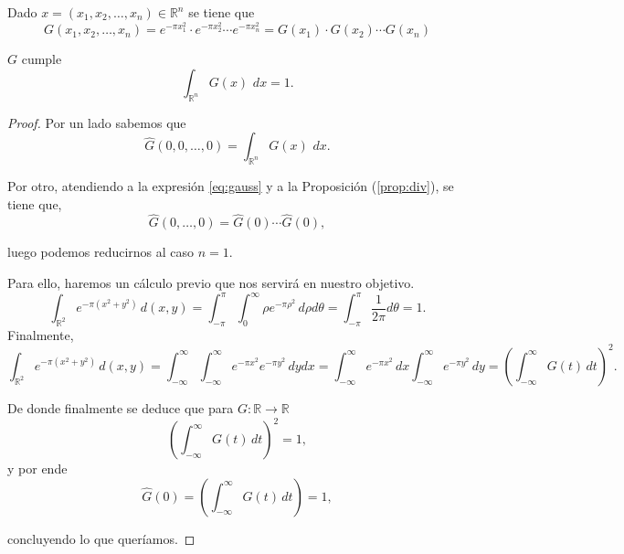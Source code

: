 \begin{observacion}\label{obs:desc}
    Dado $x = (x_1,x_2,\ldots, x_n) \in \mathbb{R}^n$ se tiene que 
    \begin{equation}\label{eq:gauss}
        G(x_1,x_2,\ldots, x_n) = e^{- \pi x_1^2} \cdot e^{- \pi x_2^2} \cdots e^{- \pi x_n^2} = G(x_1)\cdot G(x_2) \cdots G(x_n)
    \end{equation}
\end{observacion}



\begin{lema}\label{lem:leam}
$G$ cumple
\begin{equation}
    \int_{\mathbb{R}^n} G(x)\, \, dx = 1 .
\end{equation}
\end{lema}
\begin{proof}
Por un lado sabemos que
\begin{equation}
   \widehat{G}(0,0, \ldots, 0) = \int_{\mathbb{R}^n} G(x)\, \, dx   .
\end{equation}

\noindent Por otro, atendiendo a la expresión \eqref{eq:gauss} y a la Proposición (\ref{prop:div}), se tiene que, 
\begin{equation}
    \widehat{G}(0, \ldots, 0) = \widehat{G}(0) \cdots \widehat{G}(0),
\end{equation}

\noindent luego podemos reducirnos al caso $n=1$.

\noindent Para ello, haremos un cálculo previo que nos servirá en nuestro objetivo.
\begin{equation}
    \int_{\mathbb{R}^2}e^{- \pi (x^2+y^2)} \, d(x,y) = \int_{-\pi}^{\pi}\int_{0}^{\infty}\rho e^{- \pi \rho^2} \, d \rho d\theta = \int_{-\pi}^{\pi} \frac{1}{2 \pi}d\theta = 1.
\end{equation}
Finalmente, 
\begin{equation}
\int_{\mathbb{R}^2}e^{- \pi (x^2+y^2)} \, d(x,y) = \int_{-\infty}^{\infty}\int_{-\infty}^{\infty} e^{- \pi x^2}e^{- \pi y^2} \, dy dx = \int_{-\infty}^{\infty}e^{- \pi x^2}  \, dx\int_{-\infty}^{\infty} e^{- \pi y^2} \, dy = \left( \int_{-\infty}^{\infty} G(t) \, dt \right)^2.
\end{equation}

\noindent De donde finalmente se deduce que para $G: \mathbb{R}  \rightarrow \mathbb{R}$
\begin{equation}
    \left( \int_{-\infty}^{\infty} G(t) \, dt \right)^2  = 1,
\end{equation}
y por ende 
\begin{equation}
    \widehat{G}(0) = \left( \int_{-\infty}^{\infty} G(t) \, dt \right)  = 1,
\end{equation}

\noindent concluyendo lo que queríamos.




\end{proof}



